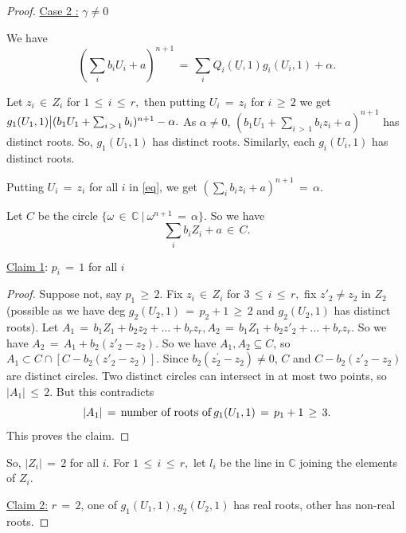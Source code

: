 \documentclass[12pt,reqno]{amsart}
\theoremstyle{definition}
\numberwithin{equation}{section}
\begin{document}
\begin{proof}
\underline{Case 2 :} $ \gamma \neq 0$

We have 
\begin{equation}\label{eq}
    (\sum_{i}b_{i}U_{i}+a)^{n+1} \,=\, \sum_{i} Q_{i}(\underline{U},1) g_{i}(U_{i},1) +\alpha.
\end{equation}

Let $z_i\,\in\, Z_i$ for $1\,\leq\, i\, \leq\, r,$ then putting $ U_{i}\,=\,z_{i}$ for $i\, \geq \,2  $ we get $ g_{1}(U_{1},1) \big{\vert} (b_{1}U_{1}+ \sum_{i\,>\,1} b_{i})^{n+1}-\alpha .$ As $ \alpha \neq 0$, $ (b_{1}U_{1}+ \sum_{i\,>\,1}b_{i}z_{i}+a)^{n+1} $ has distinct  roots. So, $ g_{1}(U_1, 1)$ has distinct roots. Similarly, each $g_{i}(U_i,1)$ has distinct roots. 

Putting $U_i\,=\,z_i$ for all $i$ in \eqref{eq}, we get $(\sum_i b_{i}z_{i}+a)^{n+1}\,=\,\alpha . $

Let $ C$ be the circle $\{ \omega\,\in\, \mathbb{C} \medspace|\medspace  \omega^{n+1} \,=\, \alpha \}.$ So we have 
\begin{equation}\label{sumbizi}
    \sum_i b_{i}Z_{i}+a\,\in\,  C. 
\end{equation}

\underline{Claim 1}: $p_{i}\,=\,1 $ for all $i$

    \begin{proof}
        
     Suppose not, say $ p_{1}\, \geq\, 2 .$ Fix $ z_i\,\in\, Z_i$ for $3\,\leq\, i\, \leq\, r,$ fix $ z'_{2}\neq z_{2}$ in  $Z_2$ (possible as we have  deg $g_{2}(U_2,1)\,=\, p_{2}+1 \,\geq\, 2$ and $ g_{2}(U_2,1) $  has distinct roots). Let $ A_{1}\,=\, b_{1}Z_{1}+ b_{2}z_{2}+ \dots + b_{r}z_{r}, A_{2} \,=\, b_{1}Z_{1}+ b_{2}z'_{2}+ \dots + b_{r}z_{r}.$ So we have 
    $ A_{2} \,=\, A_{1} + b_{2}(z'_{2}- z_{2}).$
   So we have $ A_{1},A_{2}\subseteq C$, so $ A_{1} \subset C \cap [ C- b_{2}(z'_{2}-z_{2})].$ Since $ b_{2}(z_{2}^{'}-z_{2}) \neq 0$, $C$ and $C-b_{2} (z'_{2}-z_{2}) $ are distinct circles. Two distinct circles can intersect in at most two points, so $|A_{1}|\,\leq\, 2.$ But this contradicts $$ |A_{1}| \,=\,  \textnormal{number of roots of} \medspace g_{1}(U_1,1)  \,=\, p_{1}+1\, \geq\, 3. $$  This proves the claim. 
\end{proof}
So, $|Z_i|\,=\,2$ for all $i.$
For $1\,\leq\, i\, \leq\, r,$ let $l_i$ be the line in $\mathbb{C}$ joining the elements of $Z_i$.

\underline{Claim 2:} $r\,=\,2$, one of $g_1(U_1,1), g_2(U_2,1)$ has real roots, other has non-real roots.


\end{proof}
\end{document}
